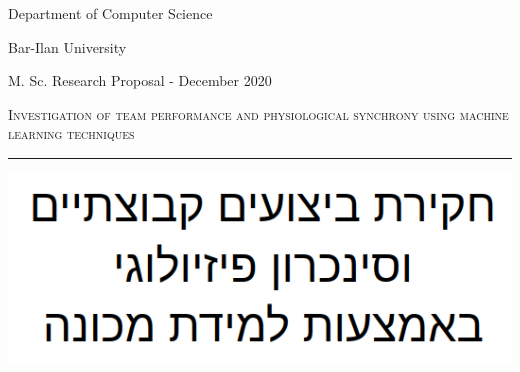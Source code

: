 \documentclass[a4paper, 11pt]{report}      %
\begin{document}
\begin{titlepage} %
	
	{\centering %
	
	
		\vspace{0.05\textheight} %
	
	\huge{Department of Computer Science
	
	Bar-Ilan University
	
	\vspace{30pt}}
	\Large{
	M. Sc. Research Proposal - December 2020
	}
	\vspace{15pt}
	
	
{\renewcommand{\baselinestretch}{1.8}\selectfont
    {\Huge \textsc{Investigation of team performance 
and physiological synchrony using machine learning techniques
}} %
\par}

	
	\vspace{0.025\textheight} %
	
	\rule{0.3\textwidth}{0.4pt} %
    \includegraphics[scale=0.55]{hebrew_title_screenshot.png}
	
}
\end{titlepage}
\end{document}
